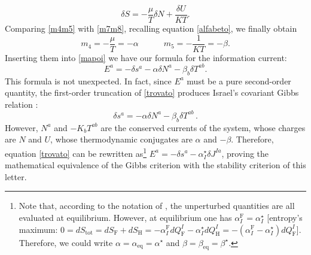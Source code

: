 \documentclass[aps,prl,reprint,nofootinbib]{revtex4-1}
\newcommand{\spc}{\quad \quad \quad}
\begin{document}
\begin{equation}\label{m7m8}
 \delta S = - \dfrac{\mu}{T} \delta N + \dfrac{\delta U}{KT} .
\end{equation}
Comparing \eqref{m4m5} with \eqref{m7m8}, recalling equation \eqref{alfabeto}, we finally obtain 
\begin{equation}
m_4 = -\dfrac{\mu}{T} = -\alpha  \spc m_5 = -\dfrac{1}{KT} = -\beta.
\end{equation} 
Inserting them into \eqref{mapoi} we have our formula for the information current:
\begin{equation}\label{trovato}
E^a = -\delta s^a -\alpha \delta N^a -\beta_b \delta T^{ab} .
\end{equation}
This formula is not unexpected. In fact, since $E^a$ must be a pure second-order quantity, the first-order truncation of \eqref{trovato} produces Israel's covariant Gibbs relation \cite{Israel_Stewart_1979}:
\begin{equation}
\delta s^a = -\alpha \delta N^a -\beta_b \delta T^{ab} \, .
\end{equation}
However, $N^a$ and $-K_b T^{ab}$ are the conserved currents of the system, whose charges are $N$ and $U$, whose thermodynamic conjugates are $\alpha$ and $-\beta$. Therefore, equation \eqref{trovato} can be rewritten as\footnote{Note that, according to the notation of \cite{GavassinoGibbs2021}, the unperturbed quantities are all evaluated at equilibrium. However, at equilibrium one has $\alpha_I^\text{F}=\alpha_I^\star$ [entropy's maximum: $0=dS_{\text{tot}}=dS_\text{F}+dS_\text{H} =-\alpha^\text{F}_I dQ^I_\text{F}-\alpha^\star_I dQ^I_\text{H}=-(\alpha_I^\text{F}-\alpha_I^\star)dQ^I_\text{F}$]. Therefore, we could write $\alpha=\alpha_{\text{eq}}=\alpha^\star$ and $\beta=\beta_{\text{eq}}=\beta^\star$.} $E^a=-\delta s^a-\alpha_I^\star \delta J^{Ia}$, proving the mathematical equivalence of the Gibbs criterion \cite{GavassinoGibbs2021} with the stability criterion of this letter.
\end{document}
